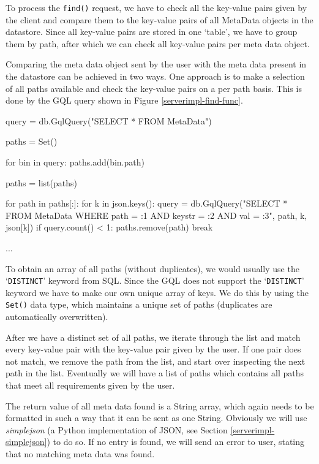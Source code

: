 To process the \texttt{find()} request, we have to check all the key-value pairs
given by the client and compare them to the key-value pairs of all MetaData objects
in the datastore. Since all key-value pairs are stored in one `table', we
have to group them by path, after which we can check all key-value pairs per
meta data object.

Comparing the meta data object sent by the user with the meta data present in
the datastore can be achieved in two ways. One approach is to make a selection of
all paths available and check the key-value pairs on a per path basis. This
is done by the GQL query shown in Figure \ref{serverimpl-find-func}.

\begin{figure*}[ht] %
\begin{center}
\begin{code}
query = db.GqlQuery("SELECT * FROM MetaData")

paths = Set()

for bin in query:
  paths.add(bin.path)
  
paths = list(paths)

for path in paths[:]:
  for k in json.keys():
    query = db.GqlQuery("SELECT * FROM MetaData WHERE path = :1 AND keystr = :2
                         AND val = :3", path, k, json[k])
    if query.count() < 1:
      paths.remove(path)
      break

...
\end{code}
\caption{\texttt{find()} Function in Detail.\label{serverimpl-find-func}}
\end{center}
\end{figure*}

To obtain an array of all paths (without duplicates), we would usually use the
`\texttt{DISTINCT}' keyword from SQL. Since the GQL does not support the
`\texttt{DISTINCT}' keyword we have to make our own unique array of keys. We do
this by using the \texttt{Set()} data type, which maintains a unique set of paths
(duplicates are automatically overwritten).

After we have a distinct set of all paths, we iterate through the list and match
every key-value pair with the key-value pair given by the user. If one pair does
not match, we remove the path from the list, and start over inspecting the next
path in the list. Eventually we will have a list of paths which contains all
paths that meet all requirements given by the user.

The return value of all meta data found is a String array, which again needs to
be formatted in such a way that it can be sent as one String. Obviously we will
use \emph{simplejson} (a Python implementation of JSON, see Section
\ref{serverimpl-simplejson}) to do so. If no entry is found, we will send an
error to user, stating that no matching meta data was found.

